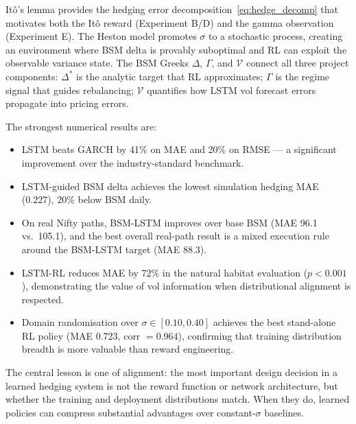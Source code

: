 \documentclass[12pt,a4paper]{article}
\begin{document}
It\^{o}'s lemma provides the hedging error decomposition~\eqref{eq:hedge_decomp}
that motivates both the It\^{o} reward (Experiment B/D) and the gamma observation
(Experiment E).  The Heston model promotes $\sigma$ to a stochastic process,
creating an environment where BSM delta is provably suboptimal and RL can
exploit the observable variance state.  The BSM Greeks $\Delta$, $\Gamma$,
and $\mathcal{V}$ connect all three project components: $\Delta^*$ is the
analytic target that RL approximates; $\Gamma$ is the regime signal that guides
rebalancing; $\mathcal{V}$ quantifies how LSTM vol forecast errors propagate
into pricing errors.

The strongest numerical results are:
\begin{itemize}[leftmargin=*]
  \item LSTM beats GARCH by 41\% on MAE and 20\% on RMSE --- a significant
        improvement over the industry-standard benchmark.
  \item LSTM-guided BSM delta achieves the lowest simulation hedging MAE
        (0.227), 20\% below BSM daily.
  \item On real Nifty paths, BSM-LSTM improves over base BSM (MAE 96.1 vs.\
        105.1), and the best overall real-path result is a mixed execution
        rule around the BSM-LSTM target (MAE 88.3).
  \item LSTM-RL reduces MAE by 72\% in the natural habitat evaluation
        ($p<0.001$), demonstrating the value of vol information when
        distributional alignment is respected.
  \item Domain randomisation over $\sigma\in[0.10,0.40]$ achieves the
        best stand-alone RL policy (MAE 0.723, corr $= 0.964$), confirming
        that training distribution breadth is more valuable than reward
        engineering.
\end{itemize}

The central lesson is one of alignment: the most important design decision in
a learned hedging system is not the reward function or network architecture,
but whether the training and deployment distributions match.  When they do,
learned policies can compress substantial advantages over constant-$\sigma$
baselines.
\end{document}

